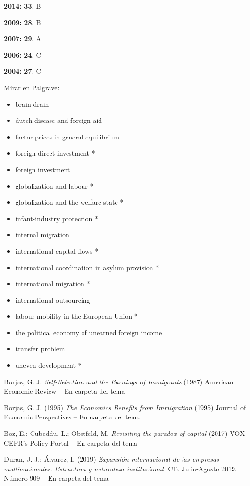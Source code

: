 \documentclass{nuevotema}
\begin{document}
\notas


\textbf{2014:} \textbf{33.} B

\textbf{2009:} \textbf{28.} B

\textbf{2007:} \textbf{29.} A

\textbf{2006:} \textbf{24.} C

\textbf{2004:} \textbf{27.} C

\bibliografia

Mirar en Palgrave:
\begin{itemize}
	\item brain drain
	\item dutch disease and foreign aid
	\item factor prices in general equilibrium
	\item foreign direct investment *
	\item foreign investment
	\item globalization and labour *
	\item globalization and the welfare state *
	\item infant-industry protection *
	\item internal migration
	\item international capital flows *
	\item international coordination in asylum provision *
	\item international migration *
	\item international outsourcing
	\item labour mobility in the European Union *
	\item the political economy of unearned foreign income
	\item transfer problem
	\item uneven development *
\end{itemize}

Borjas, G. J. \textit{Self-Selection and the Earnings of Immigrants} (1987) American Economic Review -- En carpeta del tema

Borjas, G. J. (1995) \textit{The Economics Benefits from Immigration} (1995) Journal of Economic Perspectives -- En carpeta del tema

Boz, E.; Cubeddu, L.; Obstfeld, M. \textit{Revisiting the paradox of capital} (2017) VOX CEPR's Policy Portal -- En carpeta del tema

Duran, J. J.; Álvarez, I. (2019) \textit{Expansión internacional de las empresas multinacionales. Estructura y naturaleza institucional} ICE. Julio-Agosto 2019. Número 909 -- En carpeta del tema
\end{document}

